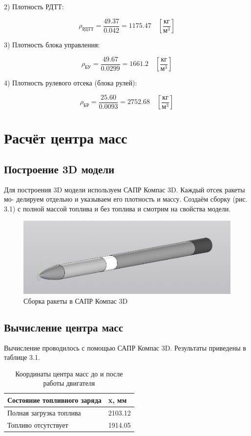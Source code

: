 \documentclass[a4paper,12pt]{report}
\begin{document}
2) Плотность РДТТ:

\[ \rho_{\text{РДТТ}} = \frac{49.37}{0.042} = 1175.47 \quad \left[\frac{\text{кг}}{\text{м}^3}\right]\]

3) Плотность блока управления:

\[ \rho_{\text{БУ}} = \frac{49.67}{0.0299} = 1661.2 \quad \left[\frac{\text{кг}}{\text{м}^3}\right]\]

4) Плотность рулевого отсека (блока рулей):

\[ \rho_{\text{БР}} = \frac{25.60}{0.0093} = 2752.68 \quad \left[\frac{\text{кг}}{\text{м}^3}\right]\]


\chapter{Расчёт центра масс}

\section{Построение 3D модели}

Для построения 3D модели используем САПР Компас 3D. Каждый отсек ракеты мо-
делируем отдельно и указываем его плотность и массу. Создаём сборку (рис. 3.1) с полной
массой топлива и без топлива и смотрим на свойства модели.

\begin{figure}[h]
\centering
\includegraphics[width=0.65\textheight]{images/6.jpg}
\caption{Сборка ракеты в САПР Компас 3D}
\label{AIM-120}
\end{figure}

\section{Вычисление центра масс}

Вычисление проводилось с помощью САПР Компас 3D. Результаты приведены в таблице 3.1.


\begin{table}[h]
\caption{Координаты центра масс до и после работы двигателя}
\label{tab:four_columns}
\centering
\begin{tabular}{|p{}|p{}|}
\hline
\textbf{Состояние топливного заряда} & \textbf{x, мм} \\
\hline
Полная загрузка топлива &  2103.12 \\
\hline
Топливо отсутствует & 1914.05 \\
\hline
\end{tabular}
\end{table}
\end{document}
